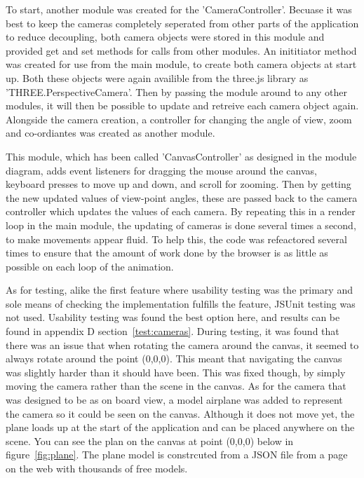 To start, another module was created for the 'CameraController'. Becuase it was best to keep the cameras completely seperated from other parts of the application to reduce decoupling, both camera objects were stored in this module and provided get and set methods for calls from other modules. An inititiator method was created for use from the main module, to create both camera objects at start up. Both these objects were again availible from the three.js library as 'THREE.PerspectiveCamera'. Then by passing the module around to any other modules, it will then be possible to update and retreive each camera object again. Alongside the camera creation, a controller for changing the angle of view, zoom and co-ordiantes was created as another module. 

This module, which has been called 'CanvasController' as designed in the module diagram, adds event listeners for dragging the mouse around the canvas, keyboard presses to move up and down, and scroll for zooming. Then by getting the new updated values of view-point angles, these are passed back to the camera controller which updates the values of each camera. By repeating this in a render loop in the main module, the updating of cameras is done several times a second, to make movements appear fluid. To help this, the code was refeactored several times to ensure that the amount of work done by the browser is as little as possible on each loop of the animation.

As for testing, alike the first feature where usability testing was the primary and sole means of checking the implementation fulfills the feature, JSUnit testing was not used. Usability testing was found the best option here, and results can be found in appendix D section~\ref{test:cameras}. During testing, it was found that there was an issue that when rotating the camera around the canvas, it seemed to always rotate around the point (0,0,0). This meant that navigating the canvas was slightly harder than it should have been. This was fixed though, by simply moving the camera rather than the scene in the canvas. As for the camera that was designed to be as on board view, a model airplane was added to represent the camera so it could be seen on the canvas. Although it does not move yet, the plane loads up at the start of the application and can be placed anywhere on the scene. You can see the plan on the canvas at point (0,0,0) below in figure~\ref{fig:plane}. The plane model is constrcuted from a JSON file from a page on the web with thousands of free models.

